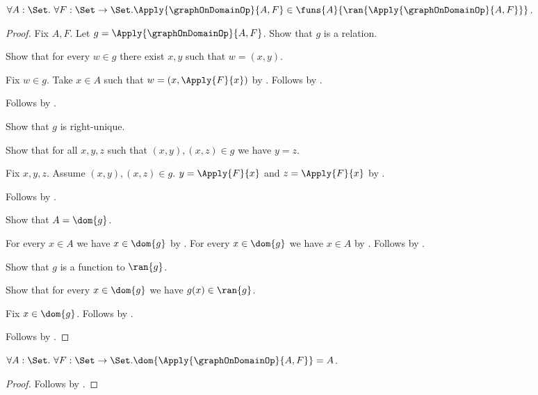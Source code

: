 \begin{theorem}\label{logical_graph_on_domain_function}
    $\forall A:\Set.\ \forall F:\Set\to\Set.
        \Apply{\graphOnDomainOp}{A,F}\in
            \funs{A}{\ran{\Apply{\graphOnDomainOp}{A,F}}}$.
\end{theorem}
\begin{proof}
    Fix $A,F$.
    Let $g=\Apply{\graphOnDomainOp}{A,F}$.
    Show that $g$ is a relation.
    \begin{subproof}
        Show that for every $w\in g$ there exist $x,y$ such that
            $w=(x,y)$.
        \begin{subproof}
            Fix $w\in g$.
            Take $x\in A$ such that $w=(x,\Apply{F}{x})$
                by .
            Follows by \auto.
        \end{subproof}
        Follows by .
    \end{subproof}
    Show that $g$ is right-unique.
    \begin{subproof}
        Show that for all $x,y,z$ such that $(x,y),(x,z)\in g$
            we have $y=z$.
        \begin{subproof}
            Fix $x,y,z$.
            Assume $(x,y),(x,z)\in g$.
            $y=\Apply{F}{x}$ and $z=\Apply{F}{x}$ by
                .
        \end{subproof}
        Follows by .
    \end{subproof}
    Show that $A=\dom{g}$.
    \begin{subproof}
        For every $x\in A$ we have $x\in\dom{g}$ by
            .
        For every $x\in\dom{g}$ we have $x\in A$ by
            .
        Follows by .
    \end{subproof}
    Show that $g$ is a function to $\ran{g}$.
    \begin{subproof}
        Show that for every $x\in\dom{g}$ we have $g(x)\in\ran{g}$.
        \begin{subproof}
            Fix $x\in\dom{g}$.
            Follows by .
        \end{subproof}
    \end{subproof}
    Follows by .
\end{proof}

\begin{proposition}\label{logical_graph_on_domain_dom}
    $\forall A:\Set.\ \forall F:\Set\to\Set.
        \dom{\Apply{\graphOnDomainOp}{A,F}}=A$.
\end{proposition}
\begin{proof}
    Follows by
        .
\end{proof}

